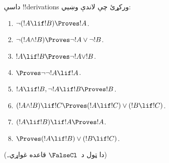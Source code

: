 \documentclass[../../../include/open-logic-section]{subfiles}
\begin{document}
\begin{prob}
داسې !!{derivation}s ورکړئ چې لاندې وښيي:
\begin{enumerate}
\item $\lnot(!A \lif !B) \Proves !A$.
\item $\lnot(!A \land !B) \Proves \lnot !A \lor \lnot !B$.
\item $!A \lif !B \Proves \lnot !A \lor !B$.
\item $\Proves \lnot \lnot !A \lif !A$.
\item $!A \lif !B, \lnot !A \lif !B \Proves !B$.
\item $(!A \land !B) \lif !C \Proves (!A \lif !C) \lor (!B \lif !C)$.
\item $(!A \lif !B) \lif !A \Proves !A$.
\item $\Proves (!A \lif !B) \lor (!B \lif !C)$.
\end{enumerate}
(دا ټول د~$\FalseCl$ قاعده غواړي۔)
\end{prob}
\end{document}
